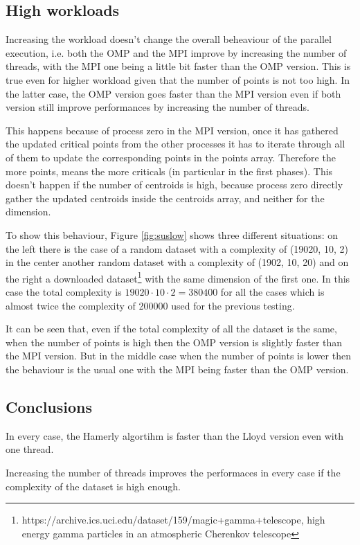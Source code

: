 \documentclass[conference]{IEEEtran}
\begin{document}
\subsection{High workloads}
Increasing the workload doesn't change the overall beheaviour of the parallel execution, i.e. both the OMP and the MPI improve by increasing the number of threads, with the MPI one being a little bit faster than the OMP version. This is true even for higher workload given that the number of points is not too high. In the latter case, the OMP version goes faster than the MPI version even if both version still improve performances by increasing the number of threads.

This happens because of process zero in the MPI version, once it has gathered the updated critical points from the other processes it has to iterate through all of them to update the corresponding points in the points array. Therefore the more points, means the more criticals (in particular in the first phases). This doesn't happen if the number of centroids is high, because process zero directly gather the updated centroids inside the centroids array, and neither for the dimension.

To show this behaviour, Figure \ref{fig:suslow} shows three different situations: on the left there is the case of a random dataset with a complexity of (19020, 10, 2) in the center another random dataset with a complexity of (1902, 10, 20) and on the right a downloaded dataset\footnote{https://archive.ics.uci.edu/dataset/159/magic+gamma+telescope, high energy gamma particles in an atmospheric Cherenkov telescope} with the same dimension of the first one. In this case the total complexity is $19020\cdot 10\cdot 2 = 380400$ for all the cases which is almost twice the complexity of 200000 used for the previous testing.

It can be seen that, even if the total complexity of all the dataset is the same, when the number of points is high then the OMP version is slightly faster than the MPI version. But in the middle case when the number of points is lower then the behaviour is the usual one with the MPI being faster than the OMP version.

\subsection{Conclusions}
In every case, the Hamerly algortihm is faster than the Lloyd version even with one thread. 

Increasing the number of threads improves the performaces in every case if the complexity of the dataset is high enough.
\end{document}

